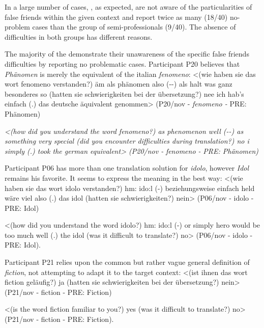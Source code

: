 \documentclass[output=paper]{langsci/langscibook.cls}
\begin{document}
 
In a large number of cases, , as expected, are not aware of the particularities of false friends within the given context and report twice as many (18/40) no-problem cases than the group of semi-professionals (9/40). The absence of difficulties in both groups has different reasons.

The majority of the  demonstrate their unawareness of the specific false friends difficulties by reporting no problematic cases. Participant P20 believes that \textit{Phänomen} is merely the  equivalent of the italian \textit{fenomeno}:  \textsf{<(wie haben sie das wort fenomeno verstanden?) äm als phänomen also (-{}-) als halt was ganz besonderes so (hatten sie schwierigkeiten bei der übersetzung?) nee ich hab's einfach (.) das} \textsf{deutsche äquivalent genommen> (P20/nov -} \textsf{\textit{fenomeno -} PRE: Phänomen)}


\textsf{\textit{<(how did you understand the word fenomeno?) as phenomenon well (-{}-) as something very special (did you encounter difficulties during translation?) no i simply (.) took the german equival}\textit{ent> (}\textit{P20/nov -} \textit{fenomeno -} \textit{PRE: Phä}\textit{nomen)}}

\newpage 
Participant P06 has more than one translation solution for \textit{idolo}, however \textit{Idol} remains his favorite. It seems to express the meaning in the best way: \textsf{<(wie haben sie das wort idolo verstanden?) hm: ido:l (-) beziehungsweise einfach held wäre viel also (.) das idol (hatten sie schwierigkeiten?) nein> (P06/nov - idolo - PRE: Idol)}


<(how did you understand the word idolo?) hm: ido:l (-) or simply hero would be too much well (.) the idol (was it difficult to translate?) no> (P06/nov - idolo - PRE: Idol). 


Participant P21 relies upon the common but rather vague general definition of \textit{fiction}, not attempting to adapt it to the target context: \textsf{<(ist ihnen das wort fiction geläufig?) ja (hatten sie schwierigkeiten bei der} \textsf{übersetzung?) nein> (P21/nov - fiction - PRE: Fiction)}


<(is the word fiction familiar to you?) yes (was it difficult to translate?) no> (P21/nov - fiction - PRE: Fiction).
\end{document}
